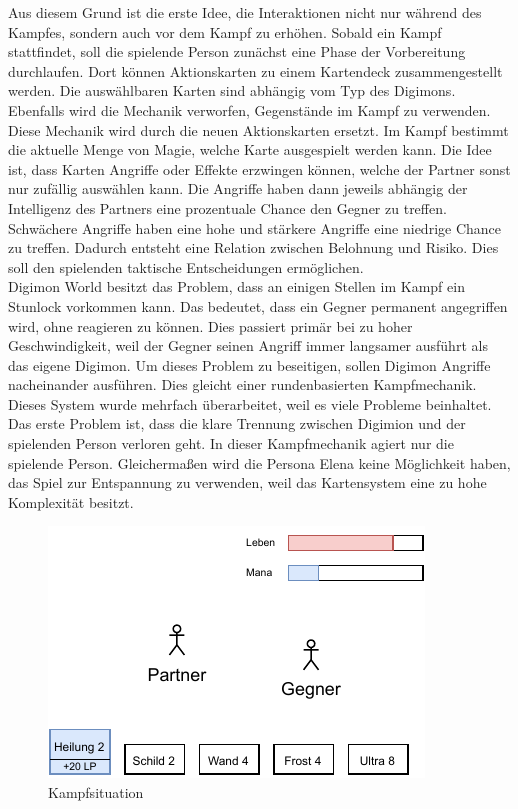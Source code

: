 Aus diesem Grund ist die erste Idee, die Interaktionen nicht nur während des Kampfes, sondern auch vor dem Kampf zu erhöhen. Sobald ein Kampf stattfindet, soll die spielende Person zunächst eine Phase der Vorbereitung durchlaufen. Dort können Aktionskarten zu einem Kartendeck zusammengestellt werden. Die auswählbaren Karten sind abhängig vom Typ des Digimons. Ebenfalls wird die Mechanik verworfen, Gegenstände im Kampf zu verwenden. Diese Mechanik wird durch die neuen Aktionskarten ersetzt. Im Kampf bestimmt die aktuelle Menge von Magie, welche Karte ausgespielt werden kann. Die Idee ist, dass Karten Angriffe oder Effekte erzwingen können, welche der Partner sonst nur zufällig auswählen kann. Die Angriffe haben dann jeweils abhängig der Intelligenz des Partners eine prozentuale Chance den Gegner zu treffen. Schwächere Angriffe haben eine hohe und stärkere Angriffe eine niedrige Chance zu treffen. Dadurch entsteht eine Relation zwischen Belohnung und Risiko. Dies soll den spielenden taktische Entscheidungen ermöglichen. \\

Digimon World besitzt das Problem, dass an einigen Stellen im Kampf ein Stunlock vorkommen kann. Das bedeutet, dass ein Gegner permanent angegriffen wird, ohne reagieren zu können. Dies passiert primär bei zu hoher Geschwindigkeit, weil der Gegner seinen Angriff immer langsamer ausführt als das eigene Digimon. Um dieses Problem zu beseitigen, sollen Digimon Angriffe nacheinander ausführen. Dies gleicht einer rundenbasierten Kampfmechanik. \\

Dieses System wurde mehrfach überarbeitet, weil es viele Probleme beinhaltet. Das erste Problem ist, dass die klare Trennung zwischen Digimion und der spielenden Person verloren geht. In dieser Kampfmechanik agiert nur die spielende Person. Gleichermaßen wird die Persona Elena keine Möglichkeit haben, das Spiel zur Entspannung zu verwenden, weil das Kartensystem eine zu hohe Komplexität besitzt. \\

\begin{figure}[H]
\centering
\includegraphics[width=0.8\columnwidth]{figures/wireframes/battle.pdf}
\caption{\label{fig:battle-wireframe}Kampfsituation}
\end{figure}

